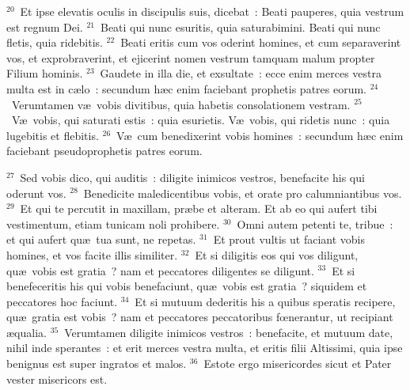 ${}^{20}$~Et ipse elevatis oculis in discipulis suis, dicebat~: Beati pauperes, quia vestrum est regnum Dei.
${}^{21}$~Beati qui nunc esuritis, quia saturabimini. Beati qui nunc fletis, quia ridebitis.
${}^{22}$~Beati eritis cum vos oderint homines, et cum separaverint vos, et exprobraverint, et ejicerint nomen vestrum tamquam malum propter Filium hominis.
${}^{23}$~Gaudete in illa die, et exsultate~: ecce enim merces vestra multa est in c\ae lo~: secundum h\ae c enim faciebant prophetis patres eorum.
${}^{24}$~Verumtamen v\ae\ vobis divitibus, quia habetis consolationem vestram.
${}^{25}$~V\ae\ vobis, qui saturati estis~: quia esurietis. V\ae\ vobis, qui ridetis nunc~: quia lugebitis et flebitis.
${}^{26}$~V\ae\ cum benedixerint vobis homines~: secundum h\ae c enim faciebant pseudoprophetis patres eorum.


${}^{27}$~Sed vobis dico, qui auditis~: diligite inimicos vestros, benefacite his qui oderunt vos.
${}^{28}$~Benedicite maledicentibus vobis, et orate pro calumniantibus vos.
${}^{29}$~Et qui te percutit in maxillam, pr\ae be et alteram. Et ab eo qui aufert tibi vestimentum, etiam tunicam noli prohibere.
${}^{30}$~Omni autem petenti te, tribue~: et qui aufert qu\ae\ tua sunt, ne repetas.
${}^{31}$~Et prout vultis ut faciant vobis homines, et vos facite illis similiter.
${}^{32}$~Et si diligitis eos qui vos diligunt, qu\ae\ vobis est gratia~? nam et peccatores diligentes se diligunt.
${}^{33}$~Et si benefeceritis his qui vobis benefaciunt, qu\ae\ vobis est gratia~? siquidem et peccatores hoc faciunt.
${}^{34}$~Et si mutuum dederitis his a quibus speratis recipere, qu\ae\ gratia est vobis~? nam et peccatores peccatoribus fœnerantur, ut recipiant \ae qualia.
${}^{35}$~Verumtamen diligite inimicos vestros~: benefacite, et mutuum date, nihil inde sperantes~: et erit merces vestra multa, et eritis filii Altissimi, quia ipse benignus est super ingratos et malos.
${}^{36}$~Estote ergo misericordes sicut et Pater vester misericors est.


